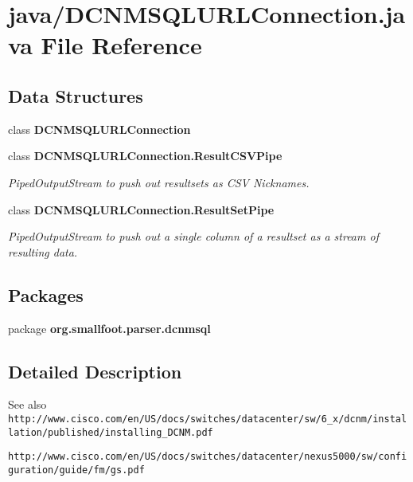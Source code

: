 \section{java/\+D\+C\+N\+M\+S\+Q\+L\+U\+R\+L\+Connection.java File Reference}
\label{DCNMSQLURLConnection_8java}
\subsection*{Data Structures}
\begin{DoxyCompactItemize}
\item 
class {\bf D\+C\+N\+M\+S\+Q\+L\+U\+R\+L\+Connection}
\item 
class {\bfseries D\+C\+N\+M\+S\+Q\+L\+U\+R\+L\+Connection.\+Result\+C\+S\+V\+Pipe}
\begin{DoxyCompactList}\small\item\em Piped\+Output\+Stream to push out resultsets as C\+S\+V Nicknames. \end{DoxyCompactList}\item 
class {\bfseries D\+C\+N\+M\+S\+Q\+L\+U\+R\+L\+Connection.\+Result\+Set\+Pipe}
\begin{DoxyCompactList}\small\item\em Piped\+Output\+Stream to push out a single column of a resultset as a stream of resulting data. \end{DoxyCompactList}\end{DoxyCompactItemize}
\subsection*{Packages}
\begin{DoxyCompactItemize}
\item 
package {\bf org.\+smallfoot.\+parser.\+dcnmsql}
\end{DoxyCompactItemize}


\subsection{Detailed Description}
\begin{DoxySeeAlso}{See also}
{\tt http\+://www.\+cisco.\+com/en/\+U\+S/docs/switches/datacenter/sw/6\+\_\+x/dcnm/installation/published/installing\+\_\+\+D\+C\+N\+M.\+pdf} 

{\tt http\+://www.\+cisco.\+com/en/\+U\+S/docs/switches/datacenter/nexus5000/sw/configuration/guide/fm/gs.\+pdf} 
\end{DoxySeeAlso}
